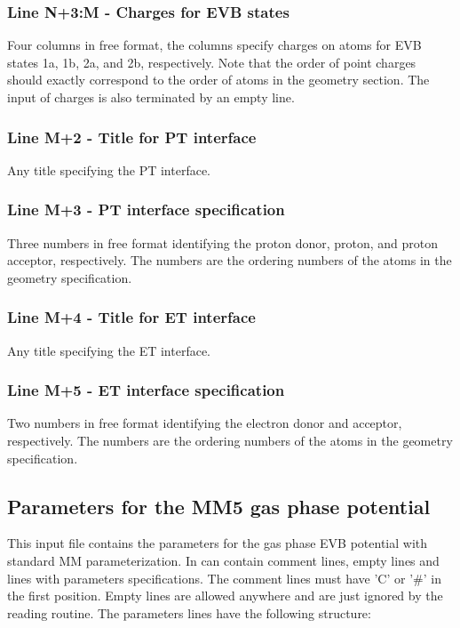 \documentclass[oneside,11pt,openany]{book}
\begin{document}
\subsubsection*{Line N+3:M - Charges for EVB states}
Four columns in free format, the columns specify charges
on atoms for EVB states 1a, 1b, 2a, and 2b, respectively.
Note that the order of point charges should exactly
correspond to the order of atoms in the geometry section.
The input of charges is also terminated by an empty line.

\subsubsection*{Line M+2 - Title for PT interface}
Any title specifying the PT interface.

\subsubsection*{Line M+3 - PT interface specification}
Three numbers in free format identifying the proton
donor, proton, and proton acceptor, respectively.
The numbers are the ordering numbers of the atoms
in the geometry specification.

\subsubsection*{Line M+4 - Title for ET interface}
Any title specifying the ET interface.

\subsubsection*{Line M+5 - ET interface specification}
Two numbers in free format identifying the electron
donor and acceptor, respectively.
The numbers are the ordering numbers of the atoms
in the geometry specification.


\subsection{Parameters for the MM5 gas phase potential}
%
This input file contains the parameters for the gas phase
EVB potential with standard MM parameterization. In can
contain comment lines, empty lines and lines with parameters
specifications. The comment lines must have 'C' or '\#'
in the first position. Empty lines are allowed anywhere
and are just ignored by the reading routine. The parameters
lines have the following structure:
\end{document}
